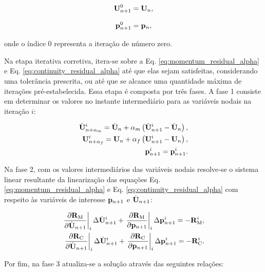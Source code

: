 \documentclass[tese_patricia]{subfiles}%
\begin{document}
\begin{align}
\mathbf{U}_{n+1}^{0} = \mathbf{U}_{n}, \label{eq:Pred2}
\end{align}

\begin{align}
\mathbf{p}_{n+1}^{0} = \mathbf{p}_{n},\label{eq:Pred3}
\end{align}

\noindent onde o índice $0$ representa a iteração de número zero. 

Na etapa iterativa corretiva, itera-se sobre a Eq. \eqref{eq:momentum_residual_alpha} e Eq. \eqref{eq:continuity_residual_alpha} até que elas sejam satisfeitas, considerando uma tolerância prescrita, ou até que se alcance uma quantidade máxima de iterações pré-estabelecida. Essa etapa é composta por três fases. A fase 1 consiste em determinar os valores no instante intermediário para as variáveis nodais na iteração $i$:

\begin{align}
\dot{\mathbf{U}}_{n+\alpha_m}^{i} = \dot{\mathbf{U}}_n + \alpha_m \left( \dot{\mathbf{U}}_{n+1}^{i} - \dot{\mathbf{U}}_n \right), \label{eq:approx_accelerationI}\\
\mathbf{U}_{n+\alpha_f}^{i} = \mathbf{U}_n + \alpha_f \left( \mathbf{U}_{n+1}^{i} - \mathbf{U}_n \right), \label{eq:approx_velocityI}\\
\mathbf{p}_{n+1}^{i} = \mathbf{p}_{n+1}^{i} \label{eq:approx_pressI}.
\end{align}

Na fase 2, com os valores intermediários das variáveis nodais resolve-se o sistema linear resultante da linearização das equações Eq. \eqref{eq:momentum_residual_alpha} e Eq. \eqref{eq:continuity_residual_alpha} com respeito às variáveis de interesse $\mathbf{p}_{n+1}$ e $\dot{\mathbf{U}}_{n+1}$:

\begin{align}
\left .\frac{\partial\mathbf{R}_\mathrm{M}}{\partial\dot{\mathbf{U}}_{n+1}}\right|_{i} \Delta \dot{\mathbf{U}}_{n+1}^{i} + \left .\frac{\partial\mathbf{R}_\mathrm{M}}{\partial\mathbf{p}_{n+1}}\right|_{i} \Delta \mathbf{p}_{n+1}^{i} = -\mathbf{R}_\mathrm{M}^{i}, \label{eq:NR1} \\
\left .\frac{\partial\mathbf{R}_\mathrm{C}}{\partial\dot{\mathbf{U}}_{n+1}}\right|_{i} \Delta \dot{\mathbf{U}}_{n+1}^{i} + \left .\frac{\partial\mathbf{R}_\mathrm{C}}{\partial\mathbf{p}_{n+1}}\right|_{i} \Delta \mathbf{p}_{n+1}^{i} = -\mathbf{R}_\mathrm{C}^{i}.\label{eq:NR2}
\end{align}

Por fim, na fase 3 atualiza-se a solução através das seguintes relações:
\end{document}
